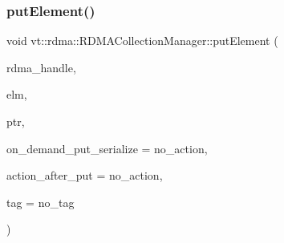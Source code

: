 \mbox{\label{structvt_1_1rdma_1_1_r_d_m_a_collection_manager_a0c39db9a1b61df2815a5bdcb9ab49bfa}} 
\subsubsection{\texorpdfstring{put\+Element()}{putElement()}}
{\footnotesize\ttfamily void vt\+::rdma\+::\+R\+D\+M\+A\+Collection\+Manager\+::put\+Element (\begin{DoxyParamCaption}\item[{\hyperlink{namespacevt_a10442579ec4e7ebef223818e64bcf908}{R\+D\+M\+A\+\_\+\+Handle\+Type} const \&}]{rdma\+\_\+handle,  }\item[{\hyperlink{namespacevt_a2c2a902092b72056f70210c159f966f0}{R\+D\+M\+A\+\_\+\+Elm\+Type} const \&}]{elm,  }\item[{\hyperlink{namespacevt_a9e2c953286c7616f7c218e9951790776}{R\+D\+M\+A\+\_\+\+Ptr\+Type} const \&}]{ptr,  }\item[{\hyperlink{namespacevt_abeb0129c92a5721f6f2c01b621f149fe}{R\+D\+M\+A\+\_\+\+Put\+Serialize}}]{on\+\_\+demand\+\_\+put\+\_\+serialize = {\ttfamily no\+\_\+action},  }\item[{\hyperlink{namespacevt_ae0a5a7b18cc99d7b732cb4d44f46b0f3}{Action\+Type}}]{action\+\_\+after\+\_\+put = {\ttfamily no\+\_\+action},  }\item[{\hyperlink{namespacevt_a84ab281dae04a52a4b243d6bf62d0e52}{Tag\+Type} const \&}]{tag = {\ttfamily no\+\_\+tag} }\end{DoxyParamCaption})\hspace{0.3cm}{\ttfamily [static]}}

\mbox{\label{structvt_1_1rdma_1_1_r_d_m_a_collection_manager_aada28534174a18a0cfc96de0b7d0d823}} 
